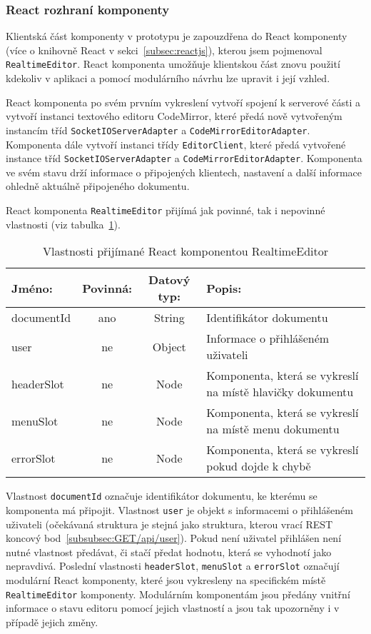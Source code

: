 
\subsubsection{React rozhraní komponenty}

Klientská část komponenty v prototypu je zapouzdřena do React komponenty (více o knihovně React v sekci~\ref{subsec:reactjs}), kterou jsem pojmenoval \texttt{RealtimeEditor}.
React komponenta umožňuje klientskou část znovu použití kdekoliv v aplikaci a pomocí modulárního návrhu lze upravit i její vzhled.

React komponenta po svém prvním vykreslení vytvoří spojení k serverové části a vytvoří instanci textového editoru CodeMirror, které předá nově vytvořeným instancím tříd \texttt{SocketIOServerAdapter} a \texttt{CodeMirrorEditorAdapter}.
Komponenta dále vytvoří instanci třídy \texttt{EditorClient}, které předá vytvořené instance tříd \texttt{SocketIOServerAdapter} a \texttt{CodeMirrorEditorAdapter}.
Komponenta ve svém stavu drží informace o připojených klientech, nastavení a další informace ohledně aktuálně připojeného dokumentu.

React komponenta \texttt{RealtimeEditor} přijímá jak povinné, tak i nepovinné vlastnosti (viz tabulka~\ref{tab:reactKomponenta}).

\begin{table}[ht!]\centering
\caption{Vlastnosti přijímané React komponentou RealtimeEditor}\label{tab:reactKomponenta}

\begin{tabular}{l c c p{5.5cm}}
    Jméno: & Povinná: & Datový typ: & Popis:\\ \hline
    documentId & ano & String & Identifikátor dokumentu\\ \hline
    user & ne & Object & Informace o přihlášeném uživateli\\ \hline
    headerSlot & ne & Node & Komponenta, která se vykreslí na místě hlavičky dokumentu \\ \hline
    menuSlot & ne & Node & Komponenta, která se vykreslí na místě menu dokumentu \\ \hline
    errorSlot & ne & Node & Komponenta, která se vykreslí pokud dojde k chybě \\
\end{tabular}
\end{table}

Vlastnost \texttt{documentId} označuje identifikátor dokumentu, ke kterému se komponenta má připojit.
Vlastnost \texttt{user} je objekt s informacemi o přihlášeném uživateli (očekávaná struktura je stejná jako struktura, kterou vrací \gls{REST} koncový bod~\ref{subsubsec:GET/api/user}).
Pokud není uživatel přihlášen není nutné vlastnost předávat, či stačí předat hodnotu, která se vyhodnotí jako nepravdivá.
Poslední vlastnosti \texttt{headerSlot}, \texttt{menuSlot} a \texttt{errorSlot} označují modulární React komponenty, které jsou vykresleny na specifickém místě \texttt{RealtimeEditor} komponenty.
Modulárním komponentám jsou předány vnitřní informace o stavu editoru pomocí jejich vlastností a jsou tak upozorněny i v případě jejich změny.

